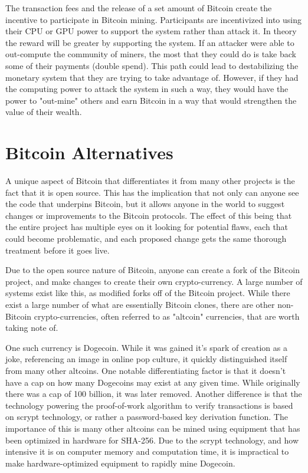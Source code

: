 \documentclass{article}
\begin{document}
	The transaction fees and the release of a set amount of Bitcoin create the incentive to participate in Bitcoin mining. Participants are incentivized into using their CPU or GPU power to support the system rather than attack it. In theory the reward will be greater by supporting the system. If an attacker were able to out-compute the community of miners, the most that they could do is take back some of their payments (double spend). This path could lead to destabilizing the monetary system that they are trying to take advantage of. However, if they had the computing power to attack the system in such a way, they would have the power to "out-mine" others and earn Bitcoin in a way that would strengthen the value of their wealth.




\section{Bitcoin Alternatives}

	A unique aspect of Bitcoin that differentiates it from many other projects is the fact that it is open source. This has the implication that not only can anyone see the code that underpins Bitcoin, but it allows anyone in the world to suggest changes or improvements to the Bitcoin protocols. The effect of this being that the entire project has multiple eyes on it looking for potential flaws, each that could become problematic, and each proposed change gets the same thorough treatment before it goes live.
	
	Due to the open source nature of Bitcoin, anyone can create a fork of the Bitcoin project, and make changes to create their own crypto-currency. A large number of systems exist like this, as modified forks off of the Bitcoin project. While there exist a large number of what are essentially Bitcoin clones, there are other non-Bitcoin crypto-currencies, often referred to as "altcoin" currencies, that are worth taking note of.
	
	One such currency is Dogecoin. While it was gained it's spark of creation as a joke, referencing an image in online pop culture, it quickly distinguished itself from many other altcoins. One notable differentiating factor is that it doesn't have a cap on how many Dogecoins may exist at any given time. While originally there was a cap of 100 billion, it was later removed. Another difference is that the technology powering the proof-of-work algorithm to verify transactions is based on scrypt technology, or rather a password-based key derivation function. The importance of this is many other altcoins can be mined using equipment that has been optimized in hardware for SHA-256. Due to the scrypt technology, and how intensive it is on computer memory and computation time, it is impractical to make hardware-optimized equipment to rapidly mine Dogecoin.
	
\end{document}
